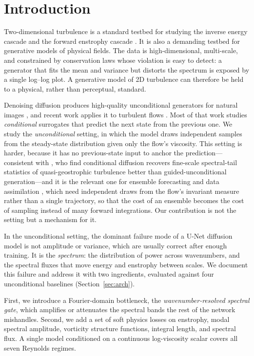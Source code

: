 \documentclass[10pt]{article} %
\begin{document}
\section{Introduction}

Two-dimensional turbulence is a standard testbed for studying the inverse energy cascade and the forward enstrophy cascade \citep{kraichnan1967inertial, batchelor1969computation}. It is also a demanding testbed for generative models of physical fields. The data is high-dimensional, multi-scale, and constrained by conservation laws whose violation is easy to detect: a generator that fits the mean and variance but distorts the spectrum is exposed by a single log--log plot. A generative model of 2D turbulence can therefore be held to a physical, rather than perceptual, standard.

Denoising diffusion produces high-quality unconditional generators for natural images \citep{ho2020ddpm, song2021score, karras2022edm}, and recent work applies it to turbulent flows \citep{shu2023diffusion, lippe2023pderefiner, kohl2024benchmarking}. Most of that work studies \emph{conditional} surrogates that predict the next state from the previous one. We study the \emph{unconditional} setting, in which the model draws independent samples from the steady-state distribution given only the flow's viscosity. This setting is harder, because it has no previous-state input to anchor the prediction---consistent with \citet{sureshbabu2025guided}, who find conditional diffusion recovers fine-scale spectral-tail statistics of quasi-geostrophic turbulence better than guided-unconditional generation---and it is the relevant one for ensemble forecasting and data assimilation \citep{rozet2023diffusion}, which need independent draws from the flow's invariant measure rather than a single trajectory, so that the cost of an ensemble becomes the cost of sampling instead of many forward integrations. Our contribution is not the setting but a mechanism for it.

In the unconditional setting, the dominant failure mode of a U-Net diffusion model is not amplitude or variance, which are usually correct after enough training. It is the \emph{spectrum}: the distribution of power across wavenumbers, and the spectral fluxes that move energy and enstrophy between scales. We document this failure and address it with two ingredients, evaluated against four unconditional baselines (Section~\ref{sec:arch}).

First, we introduce a Fourier-domain bottleneck, the \emph{wavenumber-resolved spectral gate}, which amplifies or attenuates the spectral bands the rest of the network mishandles. Second, we add a set of soft physics losses on enstrophy, modal spectral amplitude, vorticity structure functions, integral length, and spectral flux. A single model conditioned on a continuous log-viscosity scalar covers all seven Reynolds regimes.
\end{document}
